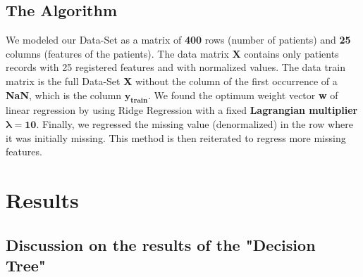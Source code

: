 \documentclass[10pt]{article}
\begin{document}
\subsection{The Algorithm}
We modeled our Data-Set as a matrix of \textbf{400} rows (number of patients) and \textbf{25} columns (features of the patients). The data matrix \textbf{X} contains only patients records with 25 registered features and with normalized values. The data train matrix is the full Data-Set \textbf{X} without the column of the first occurrence of a \textbf{NaN}, which is the column $\mathbf{y_{train}}$.
We found the optimum weight vector \textbf{w} of linear regression by using Ridge Regression with a fixed \textbf{Lagrangian multiplier} $\mathbf{\lambda = 10}$. Finally, we regressed the missing value (denormalized) in the row where it was initially missing. This method is then reiterated to regress more missing features.




\section{Results}
\subsection{Discussion on the results of the "Decision Tree"}
\end{document}
